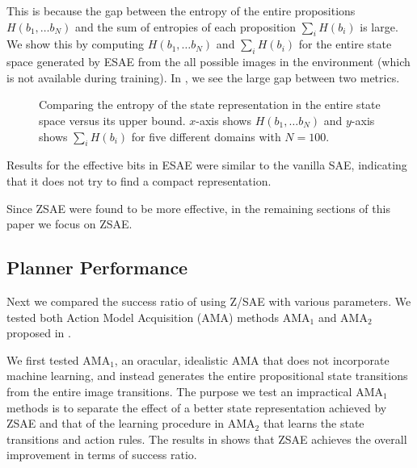 This is because the gap between the entropy of the entire propositions $H(b_1,\ldots b_N)$ and
the sum of entropies of each proposition $\sum_{i} H(b_i)$ is large.
We show this by computing $H(b_1,\ldots b_N)$ and $\sum_{i} H(b_i)$ for the entire state space
generated by ESAE from the all possible images in the environment (which is not available during training).
In , we see the large gap between two metrics.

\begin{figure}[htb]
 \vspace{1.5in}
 \caption{Comparing the entropy of the state representation in the
entire state space versus its upper bound. $x$-axis shows $H(b_1,\ldots
b_N)$ and $y$-axis shows $\sum_{i} H(b_i)$ for five different domains
with $N=100$.}
 \label{fig:entropy}
\end{figure}

Results for the effective bits in ESAE were similar to the vanilla SAE, indicating that
it does not try to find a compact representation.

Since ZSAE were found to be more effective, in the remaining sections of
this paper we focus on ZSAE.

\subsection{Planner Performance}

Next we compared the success ratio of \latentplanner using Z/SAE with various parameters.
We tested both Action Model Acquisition (AMA) methods AMA$_1$ and AMA$_2$ proposed in \cite{Asai2018}.

We first tested AMA$_1$, an oracular, idealistic AMA that does not incorporate machine learning,
and instead generates the entire propositional state transitions from the entire image transitions.
The purpose we test an impractical AMA$_1$ methods is
to separate the effect of a better state representation achieved by ZSAE
and that of the learning procedure in AMA$_2$ that learns the state transitions and action rules.
The results in  shows that ZSAE achieves the overall improvement in terms of success ratio.

